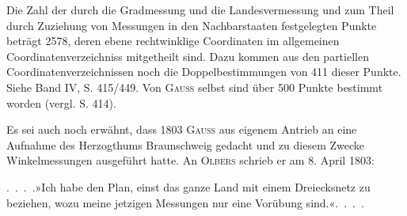 \par\noindent\hspace*{\parindent}Die Zahl der durch die Gradmessung und die Landesvermessung und zum Theil durch Zuziehung von Messungen in den Nachbarstaaten festgelegten Punkte beträgt 2578, deren ebene rechtwinklige Coordinaten im allgemeinen Coordinatenverzeichniss mitgetheilt sind. Dazu kommen aus den partiellen Coordinatenverzeichnissen noch die Doppelbestimmungen von 411 dieser Punkte. Siehe Band IV, S. 415/449. Von \textsc{Gauss} selbst sind über 500 Punkte bestimmt worden (vergl. S. 414).
\par\bigskip
\par\noindent\hspace*{\parindent}Es sei auch noch erwähnt, dass 1803 \textsc{Gauss} aus eigenem Antrieb an eine Aufnahme des Herzogthums Braunschweig gedacht und zu diesem Zwecke Winkelmessungen ausgeführt hatte. An \textsc{Olbers} schrieb er am 8. April 1803:

\par\noindent\hspace*{\parindent}.\ .\ .\ .\enspace »Ich habe den Plan, einst das ganze Land mit einem Dreiecksnetz zu beziehen, wozu meine jetzigen Messungen nur eine Vorübung sind.«\enspace .\ .\ .\ .

